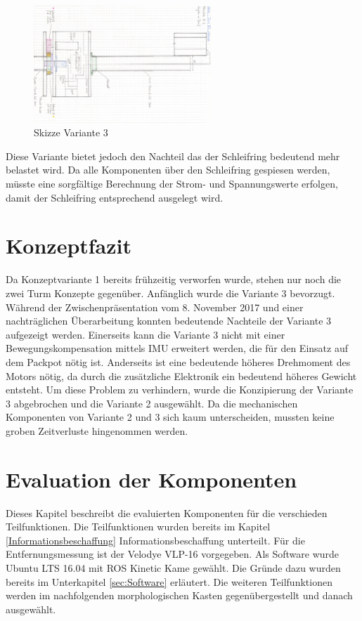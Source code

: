 \begin{figure}[H]
	\centering
	\includegraphics[angle=90,width=0.6\textwidth]{resources/skizze_rotierend.PNG}
	\caption[Skizze Varainte 3]{Skizze Variante 3 }
	\label{fig:skizze_rotierend}
\end{figure} 

Diese Variante bietet jedoch den Nachteil das der Schleifring bedeutend mehr belastet wird. Da alle Komponenten über den Schleifring gespiesen werden, müsste eine sorgfältige Berechnung der Strom- und Spannungswerte erfolgen, damit der Schleifring entsprechend ausgelegt wird.

 \section {Konzeptfazit}
 \label{sec:Konzeptfazit}
 
 Da Konzeptvariante 1 bereits frühzeitig verworfen wurde, stehen nur noch die zwei Turm Konzepte gegenüber. Anfänglich wurde die Variante 3 bevorzugt. Während der Zwischenpräsentation vom 8. November 2017 und einer nachträglichen Überarbeitung konnten bedeutende Nachteile der Variante 3 aufgezeigt werden. Einerseits kann die Variante 3 nicht mit einer Bewegungskompensation mittels \ac{IMU} erweitert werden, die für den Einsatz auf dem Packpot nötig ist. Anderseits ist eine bedeutende höheres Drehmoment des Motors nötig, da durch die zusätzliche Elektronik ein bedeutend höheres Gewicht entsteht. Um diese Problem zu verhindern, wurde die Konzipierung der Variante 3 abgebrochen und die Variante 2 ausgewählt. Da die mechanischen Komponenten von Variante 2 und 3 sich kaum unterscheiden, mussten keine groben Zeitverluste hingenommen werden.
 
\section {Evaluation der Komponenten}
\label{sec:ausgewählteKomponenten}
Dieses Kapitel beschreibt die evaluierten Komponenten für die verschieden Teilfunktionen. Die Teilfunktionen wurden bereits im  Kapitel \ref{Informationsbeschaffung} Informationsbeschaffung unterteilt. Für die Entfernungsmessung ist der Velodye VLP-16 vorgegeben. Als Software wurde Ubuntu LTS 16.04 mit ROS Kinetic Kame gewählt. Die Gründe dazu wurden bereits im Unterkapitel \ref{sec:Software} erläutert. Die weiteren Teilfunktionen werden im nachfolgenden morphologischen Kasten gegenübergestellt und danach ausgewählt.

